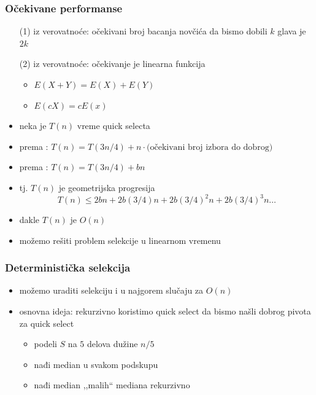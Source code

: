 \documentclass[compress]{beamer}
\begin{document}
\begin{frame}[fragile]
  \frametitle{Očekivane performanse}
  \begin{itemize}
    \item[(1)] iz verovatnoće: očekivani broj bacanja novčića da bismo dobili $k$ glava je $2k$
    \item[(2)] iz verovatnoće: očekivanje je linearna funkcija
    \begin{itemize}
      \item $E(X+Y) = E(X)+E(Y)$
      \item $E(cX) = cE(x)$
    \end{itemize}
    \item neka je $T(n)$ vreme quick selecta
    \item prema : $T(n) = T(3n/4) + n\cdot\text{(očekivani broj izbora do dobrog)}$
    \item prema : $T(n) = T(3n/4) + bn$
    \item tj. $T(n)$ je geometrijska progresija
    $$T(n) \leq 2bn + 2b(3/4)n + 2b(3/4)^2n + 2b(3/4)^3n \ldots $$
    \item dakle $T(n)$ je $O(n)$
    \item možemo rešiti problem selekcije u linearnom vremenu
  \end{itemize}
\end{frame}

\begin{frame}[fragile]
  \frametitle{Deterministička selekcija}
  \begin{itemize}
    \item možemo uraditi selekciju i u najgorem slučaju za $O(n)$
    \item osnovna ideja: rekurzivno koristimo quick select da bismo našli dobrog pivota za quick select
    \begin{itemize}
      \item podeli $S$ na $5$ delova dužine $n/5$
      \item nađi median u svakom podskupu
      \item nađi median ,,malih`` mediana rekurzivno
    \end{itemize}
  \end{itemize}
\end{frame}
\end{document}
